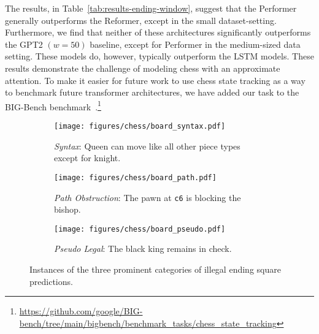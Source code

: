 \documentclass[12pt]{thesis-umich}[thesis]
\newcommand{\pos}[1]{\texttt{#1}}
\begin{document}
The results, in Table~\ref{tab:results-ending-window}, suggest that the Performer generally outperforms the Reformer, except in the small dataset-setting. Furthermore, we find that neither of these architectures significantly outperforms the GPT2 $(w = 50)$ baseline, except for Performer in the medium-sized data setting. 
These models do, however, typically outperform the LSTM models. 
These results demonstrate the challenge of modeling chess with an approximate attention. 
To make it easier for future work to use chess state tracking as a way to benchmark future transformer architectures, we have added our task to the BIG-Bench benchmark~\cite{bigbench2022}.\footnote{\url{https://github.com/google/BIG-bench/tree/main/bigbench/benchmark_tasks/chess_state_tracking}}  




\begin{figure*}[t]
\begin{subfigure}{0.3\textwidth}
   \texttt{[image: figures/chess/board\_syntax.pdf]}
   \caption{\emph{Syntax}: Queen can move like all other piece types except for knight.} \label{fig:error_syntax}
\end{subfigure}
\hspace*{\fill}
\begin{subfigure}{0.3\textwidth}
   \texttt{[image: figures/chess/board\_path.pdf]}
   \caption{\emph{Path Obstruction}: The pawn at \pos{c6} is blocking the bishop.} \label{fig:error_path}
\end{subfigure}
\hspace*{\fill}
\begin{subfigure}{0.3\textwidth}
   \texttt{[image: figures/chess/board\_pseudo.pdf]}
   \caption{\emph{Pseudo Legal}: The black king remains in check.} \label{fig:error_pseudo}
\end{subfigure}
\caption{Instances of the three prominent categories of illegal ending square predictions.}
\label{fig:error_categories}
\end{figure*}
 
\end{document}
